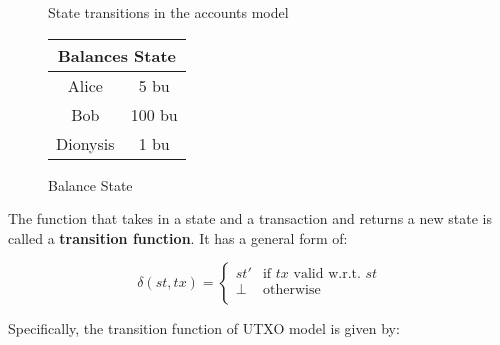 \begin{figure}[h]
    \centering
    \caption{State transitions in the accounts model}
    \label{fig.AccountsModelDiagram}
\end{figure}

\begin{figure}[ht]
    \centering
        \begin{tabular}{c|c}
        \multicolumn{2}{c}{Balances State} \\
        \hline
        Alice   & 5 bu  \\
        \hline
        Bob     & 100 bu \\
        \hline
        Dionysis & 1 bu \\
        \hline
        \end{tabular}
    \caption{Balance State}
    \label{fig.balanceState}
\end{figure}

The function that takes in a state and a transaction and returns a new state is called a \textbf{transition function}. It has a general form of:

\begin{equation}
    \delta (st,tx) =
        \begin{cases}
        st' & \text{if $tx$ valid w.r.t. $st$} \\
        \perp & \text{otherwise} \\
        \end{cases}
\end{equation}

Specifically, the transition function of UTXO model is given by:

